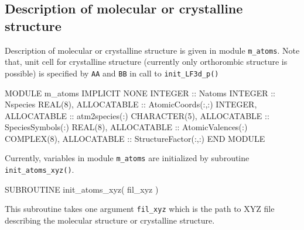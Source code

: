 \subsection{Description of molecular or crystalline structure}

Description of molecular or crystalline structure is given in module {\tt m\_atoms}.
Note that, unit cell for crystalline structure (currently only orthorombic structure is
possible) is specified by {\tt AA} and {\tt BB} in call to {\tt init\_LF3d\_p()}

\begin{fortrancode}
MODULE m_atoms
  IMPLICIT NONE 
  INTEGER :: Natoms
  INTEGER :: Nspecies
  REAL(8), ALLOCATABLE :: AtomicCoords(:,:)
  INTEGER, ALLOCATABLE :: atm2species(:)
  CHARACTER(5), ALLOCATABLE :: SpeciesSymbols(:)
  REAL(8), ALLOCATABLE :: AtomicValences(:)
  COMPLEX(8), ALLOCATABLE :: StructureFactor(:,:)
END MODULE 
\end{fortrancode}

Currently, variables in module {\tt m\_atoms} are initialized by
subroutine {\tt init\_atoms\_xyz()}.
\begin{fortrancode}
SUBROUTINE init_atoms_xyz( fil_xyz )
\end{fortrancode}
This subroutine takes one argument {\tt fil\_xyz} which is the path
to XYZ file describing the molecular structure or crystalline structure.


